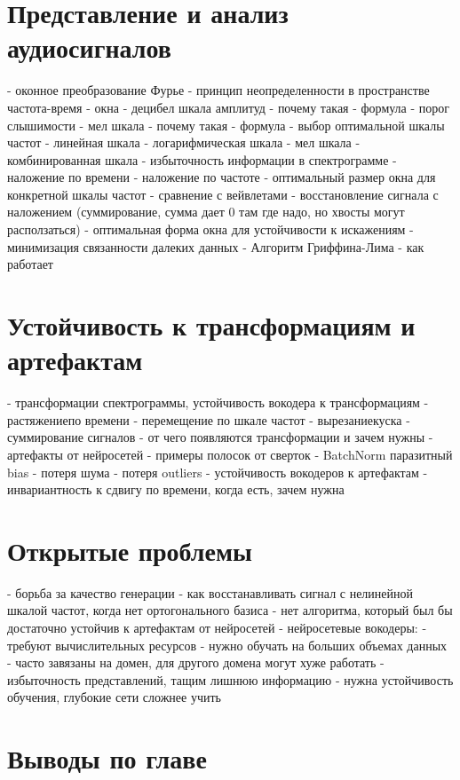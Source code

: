 \section{Представление и анализ аудиосигналов}
 - оконное преобразование Фурье
 - принцип неопределенности в пространстве частота-время
 - окна
 - децибел шкала амплитуд
   - почему такая
   - формула
   - порог слышимости
 - мел шкала
   - почему такая
   - формула
 - выбор оптимальной шкалы частот
  - линейная шкала
  - логарифмическая шкала
  - мел шкала
  - комбинированная шкала
 - избыточность информации в спектрограмме
 - наложение по времени
 - наложение по частоте
 - оптимальный размер окна для конкретной шкалы частот
 - сравнение с вейвлетами
 - восстановление сигнала с наложением (суммирование, сумма дает 0 там где надо, но хвосты могут расползаться)
 - оптимальная форма окна для устойчивости к искажениям
   - минимизация связанности далеких данных
 - Алгоритм Гриффина-Лима
    - как работает

 \section{Устойчивость к трансформациям и артефактам}
 - трансформации спектрограммы, устойчивость вокодера к трансформациям
   - растяжение по времени
   - перемещение по шкале частот
   - вырезание куска
   - суммирование сигналов
 - от чего появляются трансформации и зачем нужны
 - артефакты от нейросетей
   - примеры полосок от сверток
   - BatchNorm паразитный bias
   - потеря шума
   - потеря outliers
 - устойчивость вокодеров к артефактам
 - инвариантность к сдвигу по времени, когда есть, зачем нужна

\section{Открытые проблемы}
 - борьба за качество генерации
 - как восстанавливать сигнал с нелинейной шкалой частот, когда нет ортогонального базиса
 - нет алгоритма, который был бы достаточно устойчив к артефактам от нейросетей
 - нейросетевые вокодеры:
   - требуют вычислительных ресурсов
   - нужно обучать на больших объемах данных
   - часто завязаны на домен, для другого домена могут хуже работать
 - избыточность представлений, тащим лишнюю информацию
 - нужна устойчивость обучения, глубокие сети сложнее учить

\section{Выводы по главе}

